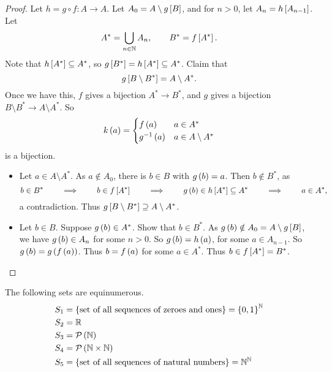 \begin{proof}
Let $ h = g \circ f : A \to A $. Let $ A_0 = A \setminus g\sb{B} $, and for $ n > 0 $, let $ A_n = h\sb{A_{n - 1}} $. Let
$$ A^* = \bigcup_{n \in \N} A_n, \qquad B^* = f\sb{A^*}. $$
Note that $ h\sb{A^*} \subseteq A^* $, so $ g\sb{B^*} = h\sb{A^*} \subseteq A^* $. Claim that
$$ g\sb{B \setminus B^*} = A \setminus A^*. $$
Once we have this, $ f $ gives a bijection $ A^* \to B^* $, and $ g $ gives a bijection $ B \setminus B^* \to A \setminus A^* $. So
$$ k\rb{a} = \begin{cases}
f\rb{a} & a \in A^* \\
g^{-1}\rb{a} & a \in A \setminus A^*
\end{cases} $$
is a bijection.
\begin{itemize}
\item Let $ a \in A \setminus A^* $. As $ a \notin A_0 $, there is $ b \in B $ with $ g\rb{b} = a $. Then $ b \notin B^* $, as
$$ b \in B^* \qquad \implies \qquad b \in f\sb{A^*} \qquad \implies \qquad g\rb{b} \in h\sb{A^*} \subseteq A^* \qquad \implies \qquad a \in A^*, $$
a contradiction. Thus $ g\sb{B \setminus B^*} \supseteq A \setminus A^* $.
\item Let $ b \in B $. Suppose $ g\rb{b} \in A^* $. Show that $ b \in B^* $. As $ g\rb{b} \notin A_0 = A \setminus g\sb{B} $, we have $ g\rb{b} \in A_n $ for some $ n > 0 $. So $ g\rb{b} = h\rb{a} $, for some $ a \in A_{n - 1} $. So $ g\rb{b} = g\rb{f\rb{a}} $. Thus $ b = f\rb{a} $ for some $ a \in A^* $. Thus $ b \in f\sb{A^*} = B^* $.
\end{itemize}
\end{proof}

\begin{example1}
The following sets are equinumerous.
\begin{align*}
S_1 & = \cb{\text{set of all sequences of zeroes and ones}} = \cb{0, 1}^\N \\
S_2 & = \R \\
S_3 & = \mathcal{P}\rb{\N} \\
S_4 & = \mathcal{P}\rb{\N \times \N} \\
S_5 & = \cb{\text{set of all sequences of natural numbers}} = \N^\N
\end{align*}
\end{example1}

